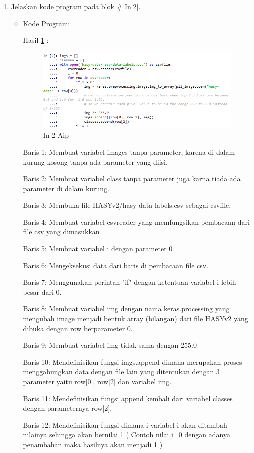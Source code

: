 \begin{enumerate}
\item Jelaskan kode program pada blok \# In[2].
\begin{itemize}
\item Kode Program:

\par Hasil \ref{in2aip} :
\begin{figure}[!hbtp]
\centering
\includegraphics[scale=0.7]{figures/AIP/prak2.PNG}
\caption{In 2 Aip}
\label{in2aip}
\end{figure}
\par Baris 1: Membuat variabel images tanpa parameter, karena di dalam kurung kosong tanpa ada parameter yang diisi.
\par Baris 2: Membuat variabel class tanpa parameter juga karna tiada ada parameter di dalam kurung.
\par Baris 3: Membuka file HASYv2/hasy-data-labels.csv sebagai csvfile.
\par Baris 4: Membuat variabel csvreader yang memfungsikan pembacaan dari file csv yang dimasukkan
\par Baris 5: Membuat variabel i dengan parameter 0
\par Baris 6: Mengeksekusi data dari baris di pembacaan file csv.
\par Baris 7: Menggunakan perintah "if" dengan ketentuan variabel i lebih besar dari  0.
\par Baris 8: Membuat variabel img dengan nama keras.processing yang mengubah image menjadi bentuk array (bilangan) dari file HASYv2 yang dibuka dengan row berparameter 0.
\par Baris 9: Membuat variabel img tidak sama dengan 255.0
\par Baris 10: Mendefinisikan fungsi imgs.append dimana merupakan proses menggabungkan data dengan file lain  yang ditentukan dengan 3 parameter yaitu row[0], row[2] dan variabel img.
\par Baris 11: Mendefinisikan fungsi append kembali dari variabel classes dengan parameternya row[2].
\par Baris 12: Mendefinisikan fungsi dimana i variabel i akan ditambah nilainya sehingga akan bernilai 1 ( Contoh nilai i=0 dengan adanya penambahan maka hasilnya akan menjadi 1 )
\end{itemize}
\par



\end{enumerate}
